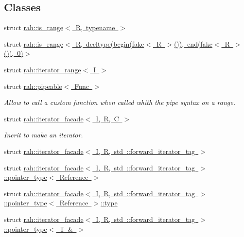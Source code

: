 \subsection*{Classes}
\begin{DoxyCompactItemize}
\item 
struct \mbox{\hyperlink{structrah_1_1is__range}{rah\+::is\+\_\+range$<$ R, typename $>$}}
\item 
struct \mbox{\hyperlink{structrah_1_1is__range_3_01_r_00_01decltype_07begin_07fake_3_01_r_01_4_07_08_08_00_01end_07fake_cf1a9a1e2579209cb82001bc9eda23c1}{rah\+::is\+\_\+range$<$ R, decltype(begin(fake$<$ R $>$()), end(fake$<$ R $>$()), 0)$>$}}
\item 
struct \mbox{\hyperlink{structrah_1_1iterator__range}{rah\+::iterator\+\_\+range$<$ I $>$}}
\item 
struct \mbox{\hyperlink{structrah_1_1pipeable}{rah\+::pipeable$<$ Func $>$}}
\begin{DoxyCompactList}\small\item\em Allow to call a custom function when called whith the \textquotesingle{}pipe\textquotesingle{} syntax on a range. \end{DoxyCompactList}\item 
struct \mbox{\hyperlink{structrah_1_1iterator__facade}{rah\+::iterator\+\_\+facade$<$ I, R, C $>$}}
\begin{DoxyCompactList}\small\item\em Inerit to make an iterator. \end{DoxyCompactList}\item 
struct \mbox{\hyperlink{structrah_1_1iterator__facade_3_01_i_00_01_r_00_01std_01_1_1forward__iterator__tag_01_4}{rah\+::iterator\+\_\+facade$<$ I, R, std \+::forward\+\_\+iterator\+\_\+tag $>$}}
\item 
struct \mbox{\hyperlink{structrah_1_1iterator__facade_3_01_i_00_01_r_00_01std_01_1_1forward__iterator__tag_01_4_1_1pointer__type}{rah\+::iterator\+\_\+facade$<$ I, R, std \+::forward\+\_\+iterator\+\_\+tag $>$\+::pointer\+\_\+type$<$ Reference $>$}}
\item 
struct \mbox{\hyperlink{structrah_1_1iterator__facade_3_01_i_00_01_r_00_01std_01_1_1forward__iterator__tag_01_4_1_1pointer__type_1_1type}{rah\+::iterator\+\_\+facade$<$ I, R, std \+::forward\+\_\+iterator\+\_\+tag $>$\+::pointer\+\_\+type$<$ Reference $>$\+::type}}
\item 
struct \mbox{\hyperlink{structrah_1_1iterator__facade_3_01_i_00_01_r_00_01std_01_1_1forward__iterator__tag_01_4_1_1pointer__type_3_01_t_01_6_01_4}{rah\+::iterator\+\_\+facade$<$ I, R, std \+::forward\+\_\+iterator\+\_\+tag $>$\+::pointer\+\_\+type$<$ T \& $>$}}

\end{DoxyCompactItemize}
